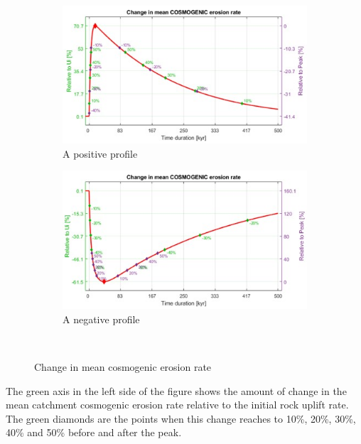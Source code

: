 \documentclass[11pt,a4paper,titlepage]{report}
\begin{document}
\begin{figure}[H]
    \centering
    \begin{subfigure}[H]{0.45\textwidth}
        \includegraphics[width=\textwidth]{CE_p.jpg}
        \caption{A positive profile}
    \end{subfigure}
    \quad
    \begin{subfigure}[H]{0.45\textwidth}
        \includegraphics[width=\textwidth]{CE_n.jpg}
        \caption{A negative profile}
    \end{subfigure}\\
    \caption[Change in mean cosmogenic erosion rate]{Change in mean cosmogenic erosion rate}
    \label{fig:erosionrate}    
\end{figure}

The green axis in the left side of the figure shows the amount of change in the mean catchment cosmogenic erosion rate relative to the initial rock uplift rate. The green diamonds are the points when this change reaches to 10\%, 20\%, 30\%, 40\% and 50\% before and after the peak.\\
\end{document}
